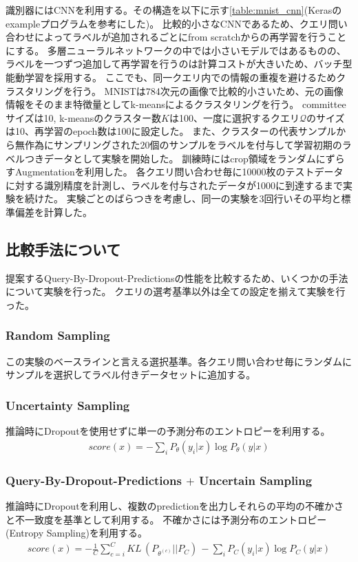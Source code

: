 識別器にはCNNを利用する。その構造を以下に示す\ref{table:mnist_cnn}(Kerasのexampleプログラムを参考にした)。
比較的小さなCNNであるため、クエリ問い合わせによってラベルが追加されるごとにfrom scratchからの再学習を行うことにする。
多層ニューラルネットワークの中では小さいモデルではあるものの、ラベルを一つずつ追加して再学習を行うのは計算コストが大きいため、バッチ型能動学習を採用する。
ここでも、同一クエリ内での情報の重複を避けるためクラスタリングを行う。
MNISTは784次元の画像で比較的小さいため、元の画像情報をそのまま特徴量としてk-meansによるクラスタリングを行う。
committeeサイズは10, k-meansのクラスター数$K$は100、一度に選択するクエリ$\mathcal{Q}$のサイズは10、再学習のepoch数は100に設定した。
また、クラスターの代表サンプルから無作為にサンプリングされた20個のサンプルをラベルを付与して学習初期のラベルつきデータとして実験を開始した。
訓練時にはcrop領域をランダムにずらすAugmentationを利用した。
各クエリ問い合わせ毎に10000枚のテストデータに対する識別精度を計測し、ラベルを付与されたデータが1000に到達するまで実験を続けた。
実験ごとのばらつきを考慮し、同一の実験を3回行いその平均と標準偏差を計算した。

\subsection{比較手法について}
提案するQuery-By-Dropout-Predictionsの性能を比較するため、いくつかの手法について実験を行った。
クエリの選考基準以外は全ての設定を揃えて実験を行った。

\subsubsection{Random Sampling}
この実験のベースラインと言える選択基準。各クエリ問い合わせ毎にランダムにサンプルを選択してラベル付きデータセットに追加する。

\subsubsection{Uncertainty Sampling}
推論時にDropoutを使用せずに単一の予測分布のエントロピーを利用する。
\begin{eqnarray}
    score(x) =  - \sum_i {P_{\theta}(y_i|x)} \log P_{\theta}(y|x)
\end{eqnarray}

\subsubsection{Query-By-Dropout-Predictions $+$ Uncertain Sampling}
推論時にDropoutを利用し、複数のpredictionを出力しそれらの平均の不確かさと不一致度を基準として利用する。
不確かさには予測分布のエントロピー(Entropy Sampling)を利用する。
\begin{eqnarray}
    score(x) =  -  \frac{1}{C} \sum_{c=i}^C KL \, (P_{\theta^{(c)}} || P_C) \, - \sum_i {P_C(y_i|x)} \log P_C(y|x)
\end{eqnarray}

